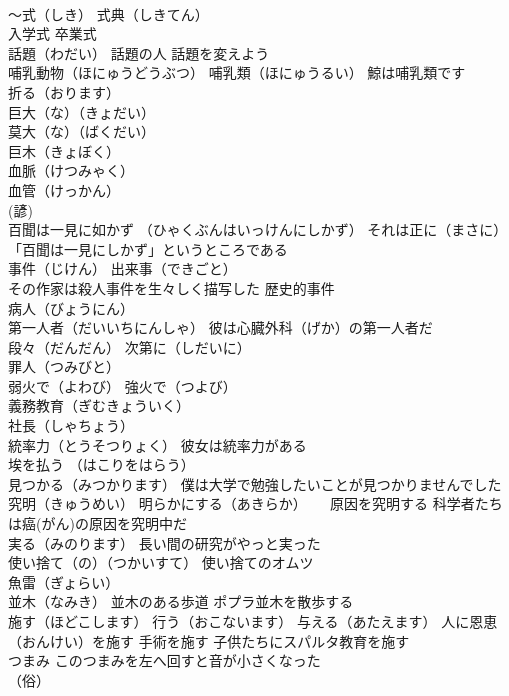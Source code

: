 \documentclass[8pt]{extreport}
\begin{document}
\begin{CJK}{UTF8}{min}
\\	～式（しき） 式典（しきてん）
\\	入学式 卒業式
\\	話題（わだい） 話題の人 話題を変えよう
\\	哺乳動物（ほにゅうどうぶつ） 哺乳類（ほにゅうるい） 鯨は哺乳類です
\\	折る（おります）
\\	巨大（な）（きょだい） 
\\	莫大（な）（ばくだい） 
\\	巨木（きょぼく）
\\	血脈（けつみゃく） 
\\	血管（けっかん）
\\	(諺)　
\\	百聞は一見に如かず （ひゃくぶんはいっけんにしかず） それは正に（まさに）「百聞は一見にしかず」というところである
\\	事件（じけん） 出来事（できごと）
\\	その作家は殺人事件を生々しく描写した 歴史的事件
\\	病人（びょうにん）
\\	第一人者（だいいちにんしゃ） 彼は心臓外科（げか）の第一人者だ
\\	段々（だんだん） 次第に（しだいに）
\\	罪人（つみびと）
\\	弱火で（よわび） 強火で（つよび）
\\	義務教育（ぎむきょういく）
\\	社長（しゃちょう）
\\	統率力（とうそつりょく） 彼女は統率力がある
\\	埃を払う （はこりをはらう）
\\	見つかる（みつかります） 僕は大学で勉強したいことが見つかりませんでした
\\	究明（きゅうめい） 明らかにする（あきらか） 　 原因を究明する 科学者たちは癌(がん)の原因を究明中だ
\\	実る（みのります） 長い間の研究がやっと実った
\\	使い捨て（の）（つかいすて） 使い捨てのオムツ
\\	魚雷（ぎょらい）
\\	並木（なみき） 並木のある歩道 ポプラ並木を散歩する
\\	施す（ほどこします） 行う（おこないます） 与える（あたえます） 人に恩恵（おんけい）を施す 手術を施す 子供たちにスパルタ教育を施す
\\	つまみ このつまみを左へ回すと音が小さくなった
\\	（俗）

\end{CJK}
\end{document}
